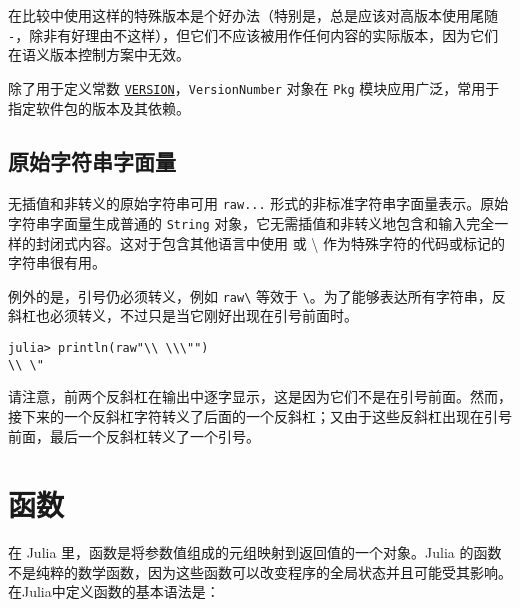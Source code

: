 在比较中使用这样的特殊版本是个好办法（特别是，总是应该对高版本使用尾随 \texttt{-}，除非有好理由不这样），但它们不应该被用作任何内容的实际版本，因为它们在语义版本控制方案中无效。



除了用于定义常数 \hyperlink{12605722316331458198}{\texttt{VERSION}}，\texttt{VersionNumber} 对象在 \texttt{Pkg} 模块应用广泛，常用于指定软件包的版本及其依赖。



\hypertarget{5096496368362976040}{}


\section{原始字符串字面量}



无插值和非转义的原始字符串可用 \texttt{raw{\textquotedbl}...{\textquotedbl}} 形式的非标准字符串字面量表示。原始字符串字面量生成普通的 \texttt{String} 对象，它无需插值和非转义地包含和输入完全一样的封闭式内容。这对于包含其他语言中使用 {\textquotedbl} 或 {\textbackslash}{\textquotedbl} 作为特殊字符的代码或标记的字符串很有用。



例外的是，引号仍必须转义，例如 \texttt{raw{\textquotedbl}{\textbackslash}{\textquotedbl}{\textquotedbl}} 等效于 \texttt{{\textquotedbl}{\textbackslash}{\textquotedbl}{\textquotedbl}}。为了能够表达所有字符串，反斜杠也必须转义，不过只是当它刚好出现在引号前面时。




\begin{verbatim}
julia> println(raw"\\ \\\"")
\\ \"
\end{verbatim}



请注意，前两个反斜杠在输出中逐字显示，这是因为它们不是在引号前面。然而，接下来的一个反斜杠字符转义了后面的一个反斜杠；又由于这些反斜杠出现在引号前面，最后一个反斜杠转义了一个引号。



\hypertarget{11836327794581856778}{}


\chapter{函数}



在 Julia 里，函数是将参数值组成的元组映射到返回值的一个对象。Julia 的函数不是纯粹的数学函数，因为这些函数可以改变程序的全局状态并且可能受其影响。在Julia中定义函数的基本语法是：




